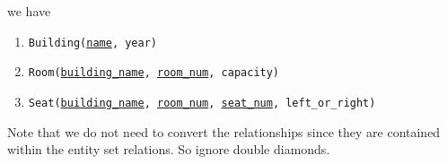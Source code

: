 \begin{example}
\begin{figure}[H]
      \caption{} 
      \label{fig:seat}
    \end{figure}
    we have 
    \begin{enumerate}
      \item \texttt{Building(\underline{name}, year)} 
      \item \texttt{Room(\underline{building\_name}, \underline{room\_num}, capacity)}
      \item \texttt{Seat(\underline{building\_name}, \underline{room\_num}, \underline{seat\_num}, left\_or\_right)}
    \end{enumerate}
    Note that we do not need to convert the relationships since they are contained within the entity set relations. So ignore double diamonds. 
  \end{example}

